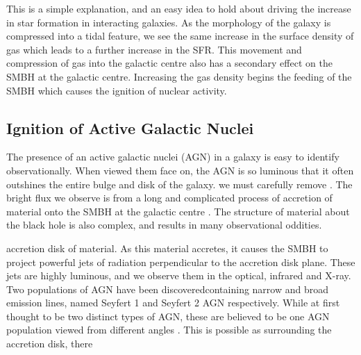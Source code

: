 This is a simple explanation, and an easy idea to hold about driving the increase in star formation in interacting galaxies. As the morphology of the galaxy is compressed into a tidal feature, we see the same increase in the surface density of gas which leads to a further increase in the SFR. This movement and compression of gas into the galactic centre also has a secondary effect on the SMBH at the galactic centre. Increasing the gas density begins the feeding of the SMBH which causes the ignition of nuclear activity.

\subsection{Ignition of Active Galactic Nuclei}
\noindent The presence of an active galactic nuclei (AGN) in a galaxy is easy to identify observationally. When viewed them face on, the AGN is so luminous that it often outshines the entire bulge and disk of the galaxy. \DIFdelbegin {}\DIFdelend \DIFaddbegin {}\DIFaddend we must carefully remove \DIFdelbegin {}\DIFdelend \DIFaddbegin {}\DIFaddend . The bright flux we observe is from a long and complicated process of accretion of material onto the SMBH at the galactic centre \citep[for an excellent breakdown of the structure and evolution of AGN see][]{2012agn..book.....B}. The structure of material about the black hole is also complex, and results in many observational oddities. 

\DIFdelbegin {}\DIFdelend \DIFaddbegin {}\DIFaddend accretion disk of material\DIFdelbegin {}\DIFdelend . As this material accretes, it causes the SMBH to project powerful jets of radiation perpendicular to the accretion disk plane. These jets are highly luminous, and we observe them in the \DIFaddbegin {}\DIFaddend optical, infrared and X-ray. Two populations of AGN have been discovered\DIFdelbegin \DIFdel{: }\DIFdelend \DIFaddbegin \DIFadd{, }\DIFaddend containing narrow and broad emission lines, named Seyfert 1 and Seyfert 2 AGN respectively. While at first thought to be two distinct types of AGN, these are believed to be one AGN population viewed from different angles \citep[for a review of the unification, see][]{2015ARA&A..53..365N}. This is possible as surrounding the accretion disk, there \DIFdelbegin {}\DIFdelend \DIFaddbegin {}


